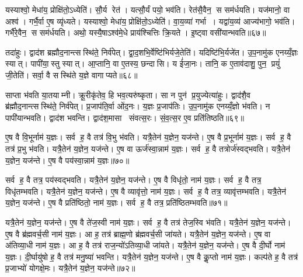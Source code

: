 यस्याश्वो॒ मेधा॑य॒ प्रोक्षि॑तो॒ऽध्येति॑। सौ॒र्य रेत॑। यत्सौ॒र्यं पयो॒ भव॑ति। रेत॑सै॒वैन॒ स सम॑र्धयति। यज॑मानो॒ वा अश्व॑। गर्भै॒र्वा ए॒ष व्यृ॑ध्यते। यस्याश्वो॒ मेधा॑य॒ प्रोक्षि॑तो॒ऽध्येति॑। वा॒य॒व्या॑ गर्भा। यद्वा॑य॒व्य॑ आज्य॑भागो॒ भव॑ति। गर्भै॑रे॒वैन॒ स सम॑र्धयति। अथो॒ यस्यै॒षाऽश्व॑मे॒धे प्राय॑श्चित्तिः क्रि॒यते। इ॒ष्ट्वा वसी॑यान्भवति॥६७॥\anuvakamend[वि॒न्दत्यश्लो॑णो है॒व भ॑वत्यधी॒यादृ॑ध्यते॒ गर्भै॑रे॒वैन॒ स सम॑र्धयति॒ द्वे च॑]

तदा॑हुः। द्वाद॑श ब्रह्मौद॒नान्त्सस्थि॑ते॒ निर्व॑पेत्। द्वा॒द॒शभि॒र्वेष्टि॑भिर्यजे॒तेति॑। यदिष्टि॑भि॒र्यजे॑त। उ॒प॒नामु॑क एनय्यँ॒ज्ञः स्यात्। पापी॑या॒स्तु स्यात्। आ॒प्तानि॒ वा ए॒तस्य॒ छन्दासि। य ई॑जा॒नः। तानि॒ क ए॒ताव॑दाशु॒ पुन॒ प्रयुं॑ जी॒तेति॑। सर्वा॒ वै सस्थि॑ते य॒ज्ञे वागाप्यते॥६८॥

साप्ता भ॑वति या॒तयाम्नी। क्रू॒रीकृ॑तेव॒ हि भव॒त्यरु॑ष्कृता। सा न पुन॑ प्र॒युज्येत्या॑हुः। द्वाद॑शै॒व ब्र॑ह्मौद॒नान्त्सस्थि॑ते॒ निर्व॑पेत्। प्र॒जाप॑ति॒र्वा ओ॑द॒नः। य॒ज्ञः प्र॒जाप॑तिः। उ॒प॒नामु॑क एनय्यँ॒ज्ञो भ॑वति। न पापी॑यान्भवति। द्वाद॑श भवन्ति। द्वाद॑श॒मासा संवत्स॒रः। सं॒व॒त्स॒र ए॒व प्रति॑तिष्ठति॥६९॥\anuvakamend[आ॒प्य॒ते॒ सं॒व॒त्स॒र एकं च]

ए॒ष वै वि॒भूर्नाम॑ य॒ज्ञः। सर्व ह॒ वै तत्र॑ वि॒भु भ॑वति। यत्रै॒तेन॑ य॒ज्ञेन॒ यज॑न्ते। ए॒ष वै प्र॒भूर्नाम॑ य॒ज्ञः। सर्व ह॒ वै तत्र॑ प्र॒भु भ॑वति। यत्रै॒तेन॑ य॒ज्ञेन॒ यज॑न्ते। ए॒ष वा ऊर्ज॑स्वा॒न्नाम॑ य॒ज्ञः। सर्व ह॒ वै तत्रोर्ज॑स्वद्भवति। यत्रै॒तेन॑ य॒ज्ञेन॒ यज॑न्ते। ए॒ष वै पय॑स्वा॒न्नाम॑ य॒ज्ञः॥७०॥

सर्व ह॒ वै तत्र॒ पय॑स्वद्भवति। यत्रै॒तेन॑ य॒ज्ञेन॒ यज॑न्ते। ए॒ष वै विधृ॑तो॒ नाम॑ य॒ज्ञः। सर्व ह॒ वै तत्र॒ विधृ॑तम्भवति। यत्रै॒तेन॑ य॒ज्ञेन॒ यज॑न्ते। ए॒ष वै व्यावृ॑त्तो॒ नाम॑ य॒ज्ञः। सर्व ह॒ वै तत्र॒ व्यावृ॑त्तम्भवति। यत्रै॒तेन॑ य॒ज्ञेन॒ यज॑न्ते। ए॒ष वै प्रति॑ष्ठितो॒ नाम॑ य॒ज्ञः। सर्व ह॒ वै तत्र॒ प्रति॑ष्ठितम्भवति॥७१॥

यत्रै॒तेन॑ य॒ज्ञेन॒ यज॑न्ते। ए॒ष वै ते॑ज॒स्वी नाम॑ य॒ज्ञः। सर्व ह॒ वै तत्र॑ तेज॒स्वि भ॑वति। यत्रै॒तेन॑ य॒ज्ञेन॒ यज॑न्ते। ए॒ष वै ब्र॑ह्मवर्च॒सी नाम॑ य॒ज्ञः। आ ह॒ तत्र॑ ब्राह्म॒णो ब्र॑ह्मवर्च॒सी जा॑यते। यत्रै॒तेन॑ य॒ज्ञेन॒ यज॑न्ते। ए॒ष वा अ॑तिव्या॒धी नाम॑ य॒ज्ञः। आ ह॒ वै तत्र॑ राज॒न्यो॑ऽतिव्या॒धी जा॑यते। यत्रै॒तेन॑ य॒ज्ञेन॒ यज॑न्ते। ए॒ष वै दी॒र्घो नाम॑ य॒ज्ञः। दी॒र्घायु॑षो ह॒ वै तत्र॑ मनु॒ष्या॑ भवन्ति। यत्रै॒तेन॑ य॒ज्ञेन॒ यज॑न्ते। ए॒ष वै कॢ॒प्तो नाम॑ य॒ज्ञः। कल्प॑ते ह॒ वै तत्र॑ प्र॒जाभ्यो॑ योगक्षे॒मः। यत्रै॒तेन॑ य॒ज्ञेन॒ यज॑न्ते॥७२॥


